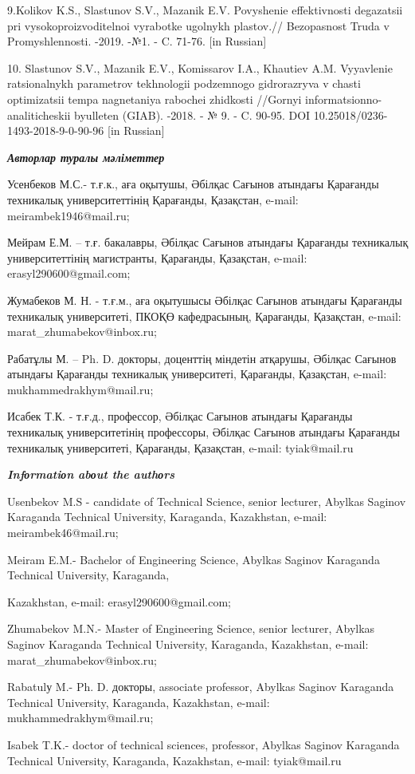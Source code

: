 \begin{noparindent}
9.Kolikov K.S., Slastunov S.V., Mazanik E.V. Povyshenie effektivnosti
degazatsii pri vysokoproizvoditel\textquotesingle noi vyrabotke
ugol\textquotesingle nykh plastov.// Bezopasnost\textquotesingle{} Truda
v Promyshlennosti. -2019. -№1. - C. 71-76. {[}in Russian{]}

10. Slastunov S.V., Mazanik E.V., Komissarov I.A., Khautiev A.M.
Vyyavlenie ratsional\textquotesingle nykh parametrov tekhnologii
podzemnogo gidrorazryva v chasti optimizatsii tempa nagnetaniya rabochei
zhidkosti //Gornyi informatsionno-analiticheskii
byulleten\textquotesingle{} (GIAB). -2018. - № 9. - C. 90-95. DOI
10.25018/0236-1493-2018-9-0-90-96 {[}in Russian{]}
\end{noparindent}

\emph{{\bfseries Авторлар туралы мәліметтер}}

\begin{noparindent}
Усенбеков М.С.- т.ғ.к., аға оқытушы, Әбілқас Сағынов атындағы Қарағанды
техникалық университеттінің Қарағанды, Қазақстан, e-mail:
meirambek1946@mail.ru;

Мейрам Е.М. -- т.ғ. бакалавры, Әбілқас Сағынов атындағы Қарағанды
техникалық университеттінің магистранты, Қарағанды, Қазақстан, e-mail:
erasyl290600@gmail.com;

Жумабеков М. Н. - т.ғ.м., аға оқытушысы Әбілқас Сағынов атындағы
Қарағанды техникалық университеті, ПКОҚӨ кафедрасының, Қарағанды,
Қазақстан, e-mail: marat\_zhumabekov@inbox.ru;

Рабатұлы М. -- Ph. D. докторы, доценттің міндетін атқарушы, Әбілқас
Сағынов атындағы Қарағанды техникалық университеті, Қарағанды,
Қазақстан, e-mail: mukhammedrakhym@mail.ru;

Исабек Т.К. - т.ғ.д., профессор, Әбілқас Сағынов атындағы Қарағанды
техникалық университетінің профессоры, Әбілқас Сағынов атындағы
Қарағанды техникалық университеті, Қарағанды, Қазақстан, e-mail:
tyiak@mail.ru
\end{noparindent}

\emph{{\bfseries Infоrmatiоn abоut the authоrs}}

\begin{noparindent}
Usenbekov M.S - candidate of Technical Science, senior lecturer, Abylkas
Saginov Karaganda Technical University, Karaganda, Kazakhstan, e-mail:
meirambek46@mail.ru;

Meiram E.M.- Bachelor of Engineering Science, Abylkas Saginov Karaganda
Technical University, Karaganda,

Kazakhstan, e-mail: erasyl290600@gmail.com;

Zhumabekov M.N.- Master of Engineering Science, senior lecturer, Abylkas
Saginov Karaganda Technical University, Karaganda, Kazakhstan, e-mail:
marat\_zhumabekov@inbox.ru;

Rabatulу M.- Ph. D. докторы, associate professor, Abylkas Saginov
Karaganda Technical University, Karaganda, Kazakhstan, e-mail:
mukhammedrakhym@mail.ru;

Isabek T.K.- doctor of technical sciences, professor, Abylkas Saginov
Karaganda Technical University, Karaganda, Kazakhstan, e-mail:
tyiak@mail.ru
\end{noparindent}
